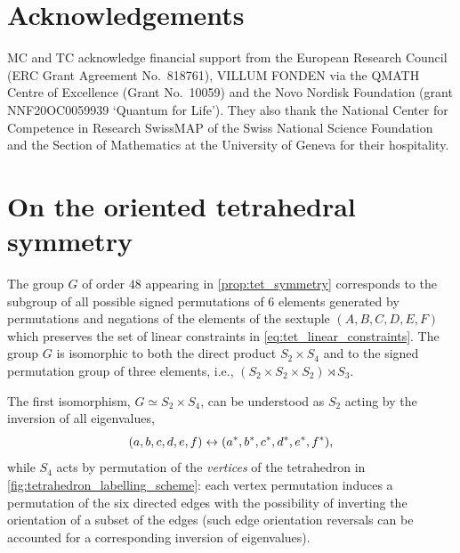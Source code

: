 \documentclass[notitlepage, 10pt]{article}
\begin{document}
\section*{Acknowledgements}
MC and TC acknowledge financial support from the European Research Council (ERC Grant Agreement No.~818761), VILLUM FONDEN via the QMATH Centre of Excellence (Grant No.~10059) and the Novo Nordisk Foundation (grant NNF20OC0059939 `Quantum for Life'). They also thank the National Center for Competence in Research SwissMAP of the Swiss National Science Foundation and the Section of Mathematics at the University of Geneva for their hospitality. 
\appendix

\section{On the oriented tetrahedral symmetry}

The group $G$ of order $48$ appearing in \cref{prop:tet_symmetry} corresponds to the subgroup of all possible signed permutations of $6$ elements generated by permutations and negations of the elements of the sextuple $(A,B,C,D,E,F)$ which preserves the set of linear constraints in \cref{eq:tet_linear_constraints}.
The group $G$ is isomorphic to both the direct product $S_2 \times S_4$ and to the signed permutation group of three elements, i.e., $(S_2 \times S_2 \times S_2) \rtimes S_3$.

The first isomorphism, $G \simeq S_2 \times S_4$, can be understood as $S_2$ acting by the inversion of all eigenvalues,
\begin{equation}
    (a,b,c,d,e,f) \leftrightarrow (a^*,b^*,c^*,d^*,e^*,f^*),
\end{equation}
while $S_4$ acts by permutation of the \textit{vertices} of the tetrahedron in \cref{fig:tetrahedron_labelling_scheme}:
each vertex permutation induces a permutation of the six directed edges with the possibility of inverting the orientation of a subset of the edges (such edge orientation reversals can be accounted for a corresponding inversion of eigenvalues).
\end{document}
